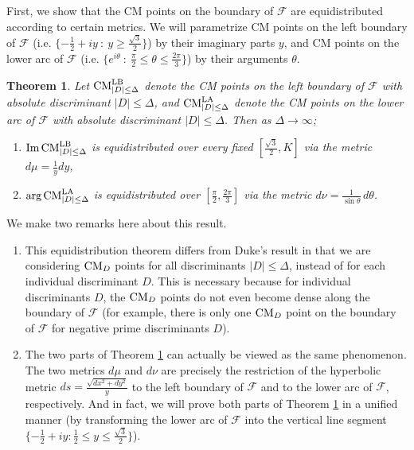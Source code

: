 \documentclass[11pt,letterpaper,reqno]{amsart}
\newtheorem{theorem}{Theorem}[section]
\numberwithin{equation}{section}
\numberwithin{figure}{section}
\numberwithin{table}{section}
\newcommand{\FF}{\mathcal{F}}
\newcommand{\CM}{\textnormal{CM}}
\begin{document}
First, we show that the CM points on the boundary of $\FF$ are equidistributed according to certain metrics. We will parametrize CM points on the left boundary of $\FF$ (i.e. $\{-\frac{1}{2} + iy \ :\ y \ge \frac{\sqrt{3}}{2}\}$) by their imaginary parts $y$, and CM points on the lower arc of $\FF$ (i.e. $\{e^{i\theta} \ :\ \frac{\pi}{2} \le \theta \le \frac{2\pi}{3} \}$) by their arguments $\theta$.
\begin{theorem} \label{thm:equidistribution-boundary}
    Let $\CM^\textnormal{LB}_{|D| \le \Delta}$ denote the CM points on the left boundary of $\FF$ with absolute discriminant $|D| \le \Delta$, and $\CM^\textnormal{LA}_{|D| \le \Delta}$ denote the CM points on the lower arc of $\FF$ with absolute discriminant $|D| \le \Delta$. Then as $\Delta \to \infty$;
    \begin{enumerate}[leftmargin=*]
        \item $\textnormal{Im\,} \CM^\textnormal{LB}_{|D|\le \Delta}$ is equidistributed over every fixed $[\frac{\sqrt 3}{2}, K]$ via the metric $d\mu = \frac{1}{y}dy$,
        \item $\textnormal{arg\,} \CM^\textnormal{LA}_{|D|\le \Delta}$ is equidistributed over $[\frac{\pi}{2}, \frac{2\pi}{3}]$ via the metric $d\nu = \frac{1}{\sin \theta} \,d\theta$.
    \end{enumerate}
\end{theorem}
We make two remarks here about this result.
\begin{enumerate}
    \item 
    This equidistribution theorem differs  from Duke's result in that we are considering $\CM_{D}$ points for all discriminants $|D| \le \Delta$, instead of for each individual discriminant $D$. This is necessary because for individual discriminants $D$, the $\CM_D$ points do not even become dense along the boundary of $\mathcal F$ (for example, there is only one $\CM_D$ point on the boundary of $\FF$ for negative prime discriminants $D$).
    \item 
    The two parts of Theorem \ref{thm:equidistribution-boundary} can actually be viewed as the same phenomenon.
    The two metrics $d\mu$ and $d\nu$ are precisely the restriction of the hyperbolic metric $ds=\frac{\sqrt{dx^2+dy^2}}{y}$ to the left boundary of $\FF$ and to the lower arc of $\FF$, respectively. And in fact, we will prove both parts of Theorem \ref{thm:equidistribution-boundary} in a unified manner (by transforming the lower arc of $\FF$ into the vertical line segment $\{-\frac{1}{2}+iy : \frac{1}{2} \le y \le \frac{\sqrt 3}{2}\}$). 
\end{enumerate}
\end{document}
